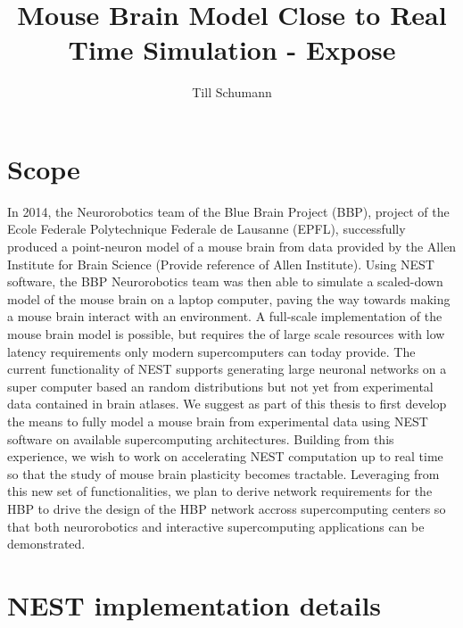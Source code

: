 \documentclass[a4paper]{article}
\title{Mouse Brain Model Close to Real Time Simulation - Expose}
\author{Till Schumann}
\begin{document}
   \maketitle


\section{Scope}
In 2014, the Neurorobotics team of the Blue Brain Project (BBP), project of the Ecole Federale Polytechnique Federale de Lausanne (EPFL), successfully produced a point-neuron model
of a mouse brain from data provided by the Allen Institute for Brain Science (Provide reference of Allen Institute).
Using NEST software, the BBP Neurorobotics team was then able to simulate a
scaled-down model of the mouse brain on a laptop computer, paving the way towards
making a mouse brain interact with an environment. A full-scale implementation of
the mouse brain model is possible, but requires the of large scale resources with low latency requirements only modern supercomputers can today provide.
The current functionality of NEST supports  generating large neuronal networks
on a super computer based an random distributions but not yet from experimental data contained in brain atlases. 
We suggest as part of this thesis to first develop the means to fully model a mouse brain from experimental data using NEST software on available supercomputing architectures.
Building from this experience, we wish to work on accelerating NEST computation up to real time so that the study of mouse brain plasticity becomes
tractable. Leveraging from this new set of functionalities, we plan to derive network requirements for the HBP to drive the design
of the HBP network accross supercomputing centers so that both neurorobotics and interactive supercomputing applications can be demonstrated.    

\section{NEST implementation details}
\end{document}
